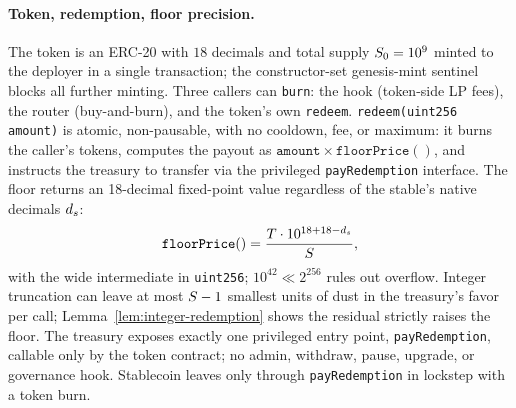 \paragraph{Token, redemption, floor precision.} The token is an ERC-20 with $18$ decimals and total supply $S_0 = 10^9$ minted to the deployer in a single transaction; the constructor-set genesis-mint sentinel blocks all further minting. Three callers can \texttt{burn}: the hook (token-side LP fees), the router (buy-and-burn), and the token's own \texttt{redeem}. \texttt{redeem(uint256 amount)} is atomic, non-pausable, with no cooldown, fee, or maximum: it burns the caller's tokens, computes the payout as $\texttt{amount} \times \texttt{floorPrice}()$, and instructs the treasury to transfer via the privileged \texttt{payRedemption} interface. The floor returns an 18-decimal fixed-point value regardless of the stable's native decimals $d_s$:
\begin{equation}
\texttt{floorPrice}() = \frac{T \cdot 10^{18 + 18 - d_s}}{S},
\label{eq:floor-precision}
\end{equation}
with the wide intermediate in \texttt{uint256}; $10^{42} \ll 2^{256}$ rules out overflow. Integer truncation can leave at most $S - 1$ smallest units of dust in the treasury's favor per call; Lemma~\ref{lem:integer-redemption} shows the residual strictly raises the floor. The treasury exposes exactly one privileged entry point, \texttt{payRedemption}, callable only by the token contract; no admin, withdraw, pause, upgrade, or governance hook. Stablecoin leaves only through \texttt{payRedemption} in lockstep with a token burn.


